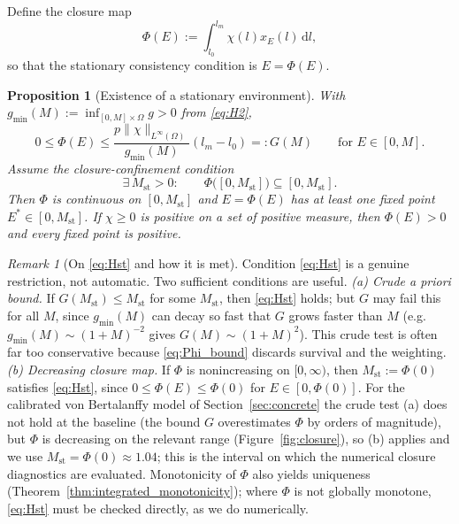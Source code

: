 \documentclass[pdflatex,sn-mathphys-num]{sn-jnl}
\newcommand{\Om}{\Omega}
\newcommand{\dd}{\,\mathrm{d}}
\theoremstyle{plain}
\newtheorem{proposition}[theorem]{Proposition}
\theoremstyle{definition}
\theoremstyle{remark}
\newtheorem{remark}[theorem]{Remark}
\begin{document}
Define the closure map
\begin{equation}\label{eq:Phi}
\Phi(E):=\int_{l_0}^{l_m}\chi(l)x_E(l)\dd l,
\end{equation}
so that the stationary consistency condition is $E=\Phi(E)$.

\begin{proposition}[Existence of a stationary environment]
\label{prop:Phi_existence}
With $g_{\min}(M):=\inf_{[0,M]\times\Om}g>0$ from \eqref{eq:H2},
\begin{equation}\label{eq:Phi_bound}
0\le\Phi(E)\le \frac{p\|\chi\|_{L^\infty(\Om)}}{g_{\min}(M)}(l_m-l_0)=:G(M)
\qquad\text{for }E\in[0,M].
\end{equation}
Assume the closure-confinement condition
\begin{equation}\label{eq:Hst}
\exists\,M_{\mathrm{st}}>0:\qquad
\Phi\big([0,M_{\mathrm{st}}]\big)\subseteq[0,M_{\mathrm{st}}].
\tag{H-st}
\end{equation}
Then $\Phi$ is continuous on $[0,M_{\mathrm{st}}]$ and $E=\Phi(E)$ has at least one
fixed point $E^*\in[0,M_{\mathrm{st}}]$. If $\chi\ge0$ is positive on a set of
positive measure, then $\Phi(E)>0$ and every fixed point is positive.
\end{proposition}

\begin{remark}[On \eqref{eq:Hst} and how it is met]
\label{rmk:Hst}
Condition \eqref{eq:Hst} is a genuine restriction, not automatic. Two sufficient
conditions are useful. \emph{(a) Crude a priori bound.} If $G(M_{\mathrm{st}})\le
M_{\mathrm{st}}$ for some $M_{\mathrm{st}}$, then \eqref{eq:Hst} holds; but $G$ may
fail this for all $M$, since $g_{\min}(M)$ can decay so fast that $G$ grows faster
than $M$ (e.g.\ $g_{\min}(M)\sim(1+M)^{-2}$ gives $G(M)\sim(1+M)^2$). This crude
test is often far too conservative because \eqref{eq:Phi_bound} discards survival
and the weighting. \emph{(b) Decreasing closure map.} If $\Phi$ is nonincreasing
on $[0,\infty)$, then $M_{\mathrm{st}}:=\Phi(0)$ satisfies \eqref{eq:Hst}, since
$0\le\Phi(E)\le\Phi(0)$ for $E\in[0,\Phi(0)]$. For the calibrated von Bertalanffy
model of Section~\ref{sec:concrete} the crude test (a) does not hold at the
baseline (the bound $G$ overestimates $\Phi$ by orders of magnitude), but $\Phi$
is decreasing on the relevant range (Figure~\ref{fig:closure}), so (b) applies and
we use $M_{\mathrm{st}}=\Phi(0)\approx1.04$; this is the interval on which the
numerical closure diagnostics are evaluated. Monotonicity of $\Phi$ also yields
uniqueness (Theorem~\ref{thm:integrated_monotonicity}); where $\Phi$ is not
globally monotone, \eqref{eq:Hst} must be checked directly, as we do numerically.
\end{remark}
\end{document}
